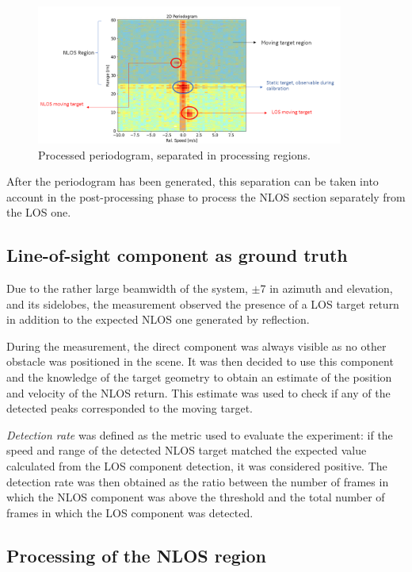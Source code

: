 \begin{figure}[H]
	\centering
	\includegraphics[width=0.9\textwidth]{Images/Test1/nlos-los-separation.png}
	\caption{Processed periodogram, separated in processing regions.}
	\label{fig:Test1_nlos_los_separation}
\end{figure}


After the periodogram has been generated, this separation can be taken into account in the post-processing phase to process the NLOS section separately from the LOS one.

\subsection{Line-of-sight component as ground truth}

Due to the rather large beamwidth of the system, $\pm$7\textdegree\hspace{1pt} in azimuth and elevation, and its sidelobes, the measurement observed the presence of a LOS target return in addition to the expected NLOS one generated by reflection.

During the measurement, the direct component was always visible as no other obstacle was positioned in the scene. It was then decided to use this component and the knowledge of the target geometry to obtain an estimate of the position and velocity of the NLOS return. This estimate was used to check if any of the detected peaks corresponded to the moving target.

\textit{Detection rate} was defined as the metric used to evaluate the experiment: if the speed and range of the detected NLOS target matched the expected value calculated from the LOS component detection, it was considered positive.
The detection rate was then obtained as the ratio between the number of frames in which the NLOS component was above the threshold and the total number of frames in which the LOS component was detected.

\subsection{Processing of the NLOS region}

